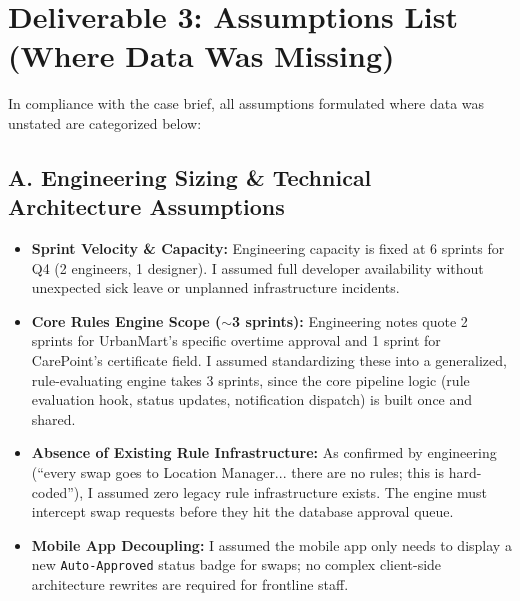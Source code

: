 \documentclass[10pt,a4paper]{article}
\begin{document}
\vspace{-3mm}
\section*{Deliverable 3: Assumptions List (Where Data Was Missing)}

In compliance with the case brief, all assumptions formulated where data was unstated are categorized below:

\subsection*{A. Engineering Sizing \& Technical Architecture Assumptions}
\begin{itemize}[itemsep=1pt,topsep=1pt]
    \item \textbf{Sprint Velocity \& Capacity:} Engineering capacity is fixed at 6 sprints for Q4 (2 engineers, 1 designer). I assumed full developer availability without unexpected sick leave or unplanned infrastructure incidents.
    \item \textbf{Core Rules Engine Scope ($\sim$3 sprints):} Engineering notes quote 2 sprints for UrbanMart's specific overtime approval and 1 sprint for CarePoint's certificate field. I assumed standardizing these into a generalized, rule-evaluating engine takes 3 sprints, since the core pipeline logic (rule evaluation hook, status updates, notification dispatch) is built once and shared.
    \item \textbf{Absence of Existing Rule Infrastructure:} As confirmed by engineering (``every swap goes to Location Manager... there are no rules; this is hard-coded''), I assumed zero legacy rule infrastructure exists. The engine must intercept swap requests before they hit the database approval queue.
    \item \textbf{Mobile App Decoupling:} I assumed the mobile app only needs to display a new \texttt{Auto-Approved} status badge for swaps; no complex client-side architecture rewrites are required for frontline staff.
\end{itemize}
\end{document}
